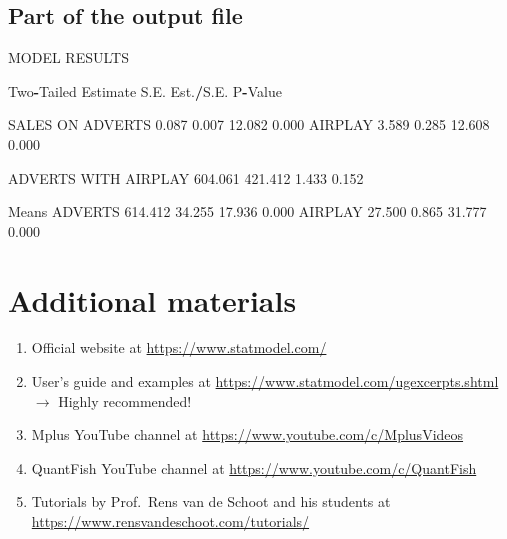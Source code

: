 \documentclass[
]{book}
\newenvironment{Shaded}{\begin{snugshade}}{\end{snugshade}}
\newcommand{\FloatTok}[1]{\textcolor[rgb]{0.00,0.00,0.81}{#1}}
\newcommand{\NormalTok}[1]{#1}
\newcommand{\SpecialCharTok}[1]{\textcolor[rgb]{0.81,0.36,0.00}{\textbf{#1}}}
\begin{document}
\hypertarget{part-of-the-output-file}{%
\subsection{Part of the output file}\label{part-of-the-output-file}}

\begin{Shaded}
\begin{Highlighting}[]
\NormalTok{MODEL RESULTS}

\NormalTok{                                                    Two}\SpecialCharTok{{-}}\NormalTok{Tailed}
\NormalTok{                    Estimate       S.E.  Est.}\SpecialCharTok{/}\NormalTok{S.E.    P}\SpecialCharTok{{-}}\NormalTok{Value}

\NormalTok{ SALES    ON}
\NormalTok{    ADVERTS            }\FloatTok{0.087}      \FloatTok{0.007}     \FloatTok{12.082}      \FloatTok{0.000}
\NormalTok{    AIRPLAY            }\FloatTok{3.589}      \FloatTok{0.285}     \FloatTok{12.608}      \FloatTok{0.000}

\NormalTok{ ADVERTS  WITH}
\NormalTok{    AIRPLAY          }\FloatTok{604.061}    \FloatTok{421.412}      \FloatTok{1.433}      \FloatTok{0.152}

\NormalTok{ Means}
\NormalTok{    ADVERTS          }\FloatTok{614.412}     \FloatTok{34.255}     \FloatTok{17.936}      \FloatTok{0.000}
\NormalTok{    AIRPLAY           }\FloatTok{27.500}      \FloatTok{0.865}     \FloatTok{31.777}      \FloatTok{0.000}
\end{Highlighting}
\end{Shaded}

\hypertarget{additional-materials}{%
\section{Additional materials}\label{additional-materials}}

\begin{enumerate}
\def\labelenumi{\arabic{enumi}.}
\item
  Official website at \url{https://www.statmodel.com/}
\item
  User's guide and examples at \url{https://www.statmodel.com/ugexcerpts.shtml} \(\rightarrow\) Highly recommended!
\item
  Mplus YouTube channel at \url{https://www.youtube.com/c/MplusVideos}
\item
  QuantFish YouTube channel at \url{https://www.youtube.com/c/QuantFish}
\item
  Tutorials by Prof.~Rens van de Schoot and his students at \url{https://www.rensvandeschoot.com/tutorials/}
\end{enumerate}
\end{document}
